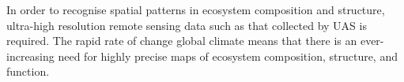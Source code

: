 In order to recognise spatial patterns in ecosystem  composition and structure, ultra-high resolution 
remote sensing data such as that collected by UAS is required. The rapid rate of change global climate
means that there is an ever-increasing need for highly precise maps of ecosystem composition, structure,
and function.